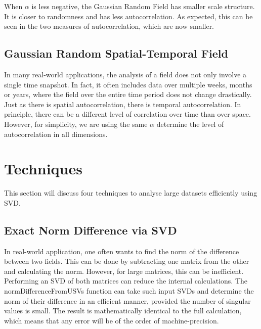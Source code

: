 \documentclass{acm_proc_article-sp}
\begin{document}
When $\alpha$ is less negative, the Gaussian Random Field has smaller scale structure. It is closer to randomness and has less autocorrelation. As expected, this can be seen in the two measures of autocorrelation, which are now smaller.

\subsection{Gaussian Random Spatial-Temporal Field}
\label{sec:Introduction Gaussian Random Spatial-Temporal Field}

In many real-world applications, the analysis of a field does not only involve a single time snapshot. In fact, it often includes data over multiple weeks, months or years, where the field over the entire time period does not change drastically. Just as there is spatial autocorrelation, there is temporal autocorrelation. In principle, there can be a different level of correlation over time than over space. However, for simplicity, we are using the same $\alpha$ determine the level of autocorrelation in all dimensions.

\section{Techniques}
\label{Techniques}

This section will discuss four techniques to analyse large datasets efficiently using SVD.

\subsection{Exact Norm Difference via SVD}
\label{sec:Techniques Exact Norm Difference via SVD}

In real-world application, one often wants to find the norm of the difference between two fields. This can be done by subtracting one matrix from the other and calculating the norm. However, for large matrices, this can be inefficient. Performing an SVD of both matrices can reduce the internal calculations. The normDifferenceFromUSVs function can take such input SVDs and determine the norm of their difference in an efficient manner, provided the number of singular values is small. The result is mathematically identical to the full calculation, which means that any error will be of the order of machine-precision.
\end{document}
